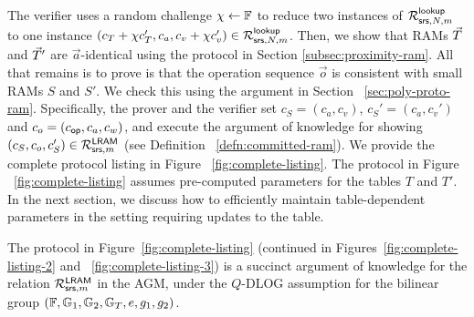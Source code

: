 The verifier uses a random challenge $\chi\gets \mathbb{F}$ to reduce two instances of $\mathcal{R}^{\mathsf{lookup}}_{\mathsf{srs},N,m}$ to one instance
$(c_T + \chi c_T', c_a, c_v + \chi c_v')\in \mathcal{R}^{\mathsf{lookup}}_{\mathsf{srs},N,m}$. Then, we show that
RAMs $\vec{T}$ and $\vec{T}'$ are $\vec{a}$-identical using the protocol in Section \ref{subsec:proximity-ram}.
All that remains is to prove is that the operation sequence $\vec{o}$ is consistent with small RAMs $S$ and $S'$.
We check this using the argument in Section ~\ref{sec:poly-proto-ram}. Specifically, the prover and the verifier set
$c_S = (c_a, c_v)$, $c_S'=(c_a, c_v')$ and $c_o = (c_{\mathsf{op}}, c_a, c_w)$, and execute the argument of knowledge for
showing $(c_S, c_o, c_S')\in \mathcal{R}^{\mathsf{LRAM}}_{\mathsf{srs},m}$ (see Definition ~\ref{defn:committed-ram}). We provide the complete protocol
listing in Figure ~\ref{fig:complete-listing}. The protocol in Figure ~\ref{fig:complete-listing} assumes pre-computed parameters
for the tables $T$ and $T'$. In the next section, we discuss how to efficiently maintain table-dependent parameters in the setting
requiring updates to the table.

\begin{theorem}\label{thm:committed-ram}
The protocol in Figure~\ref{fig:complete-listing} (continued in Figures~\ref{fig:complete-listing-2} and
~\ref{fig:complete-listing-3}) is a succinct argument of knowledge for the relation $\mathcal{R}^{\mathsf{LRAM}}_{\mathsf{srs},m}$ in
the AGM, under the $Q$-DLOG assumption for the bilinear group $(\mathbb{F},\mathbb{G}_1,\mathbb{G}_2,\mathbb{G}_T,e,g_1,g_2)$.
\end{theorem}

